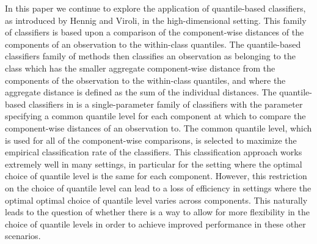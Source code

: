 In this paper we continue to explore the application of quantile-based
classifiers, as introduced by Hennig and Viroli, in the high-dimensional
setting.  This family of classifiers is based upon a comparison of the
component-wise distances of the components of an observation to the within-class
quantiles.  The quantile-based classifiers family of methods then classifies an
observation as belonging to the class which has the smaller aggregate
component-wise distance from the components of the observation to the
within-class quantiles, and where the aggregate distance is defined as the sum
of the individual distances.  The quantile-based classifiers in
\citep{hennig2016} is a single-parameter family of classifiers with the
parameter specifying a common quantile level for each component at which to
compare the component-wise distances of an observation to.  The common quantile
level, which is used for all of the component-wise comparisons, is selected to
maximize the empirical classification rate of the classifiers.  This
classification approach works extremely well in many settings, in particular for
the setting where the optimal choice of quantile level is the same for each
component.  However, this restriction on the choice of quantile level can lead
to a loss of efficiency in settings where the optimal optimal choice of quantile
level varies across components.  This naturally leads to the question of whether
there is a way to allow for more flexibility in the choice of quantile levels in
order to achieve improved performance in these other scenarios.

